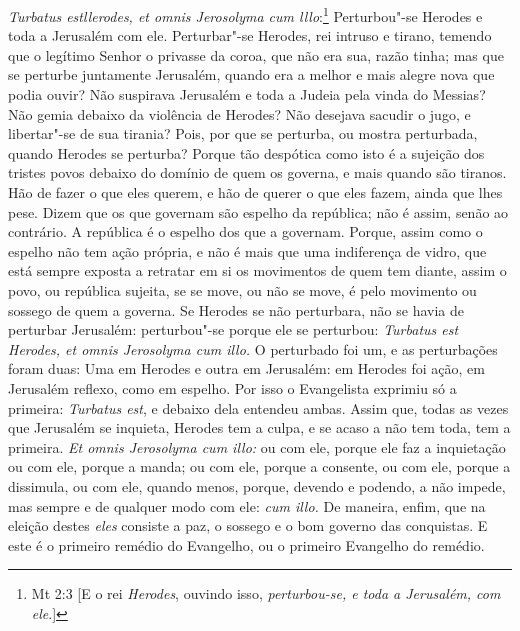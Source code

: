 \emph{Turbatus estllerodes, et omnis Jerosolyma cum lllo}:\footnote{Mt 2:3 [E o rei \emph{Herodes}, ouvindo isso, \emph{perturbou-se, e toda a Jerusalém, com ele}.]}
Perturbou"-se Herodes e toda a Jerusalém com ele. Perturbar"-se Herodes,
rei intruso e tirano, temendo que o legítimo Senhor o privasse da coroa,
que não era sua, razão tinha; mas que se perturbe juntamente Jerusalém,
quando era a melhor e mais alegre nova que podia ouvir? Não suspirava
Jerusalém e toda a Judeia pela vinda do Messias? Não gemia debaixo da
violência de Herodes? Não desejava sacudir o jugo, e libertar"-se de sua
tirania? Pois, por que se perturba, ou mostra perturbada, quando Herodes
se perturba? Porque tão despótica como isto é a sujeição dos tristes
povos debaixo do domínio de quem os governa, e mais quando são tiranos.
Hão de fazer o que eles querem, e hão de querer o que eles fazem, ainda
que lhes pese. Dizem que os que governam são espelho da república; não é
assim, senão ao contrário. A república é o espelho dos que a governam.
Porque, assim como o espelho não tem ação própria, e não é mais que uma
indiferença de vidro, que está sempre exposta a retratar em si os
movimentos de quem tem diante, assim o povo, ou república sujeita, se se
move, ou não se move, é pelo movimento ou sossego de quem a governa. Se
Herodes se não perturbara, não se havia de perturbar Jerusalém:
perturbou"-se porque ele se perturbou: \emph{Turbatus est Herodes, et
omnis Jerosolyma cum illo.} O perturbado foi um, e as perturbações foram
duas: Uma em Herodes e outra em Jerusalém: em Herodes foi ação, em
Jerusalém reflexo, como em espelho. Por isso o Evangelista exprimiu só a
primeira: \emph{Turbatus est}, e debaixo dela entendeu ambas. Assim
que, todas as vezes que Jerusalém se inquieta, Herodes tem a culpa, e se
acaso a não tem toda, tem a primeira. \emph{Et omnis Jerosolyma cum
illo:} ou com ele, porque ele faz a inquietação ou com ele, porque a
manda; ou com ele, porque a consente, ou com ele, porque a dissimula, ou
com ele, quando menos, porque, devendo e podendo, a não impede, mas
sempre e de qualquer modo com ele: \emph{cum illo.} De maneira, enfim,
que na eleição destes \emph{eles} consiste a paz, o sossego e o bom
governo das conquistas. E este é o primeiro remédio do Evangelho, ou o
primeiro Evangelho do remédio.

